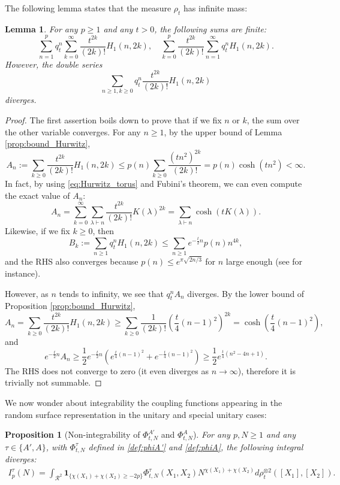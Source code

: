 \documentclass[11pt,a4paper,reqno]{article}
\newtheorem{lemma}[theorem]{Lemma}
\newtheorem{proposition}[theorem]{Proposition}
\theoremstyle{definition}
\theoremstyle{remark}
\begin{document}
The following lemma states that the measure $\rho_t$ has infinite mass:


\begin{lemma}\label{lem:infinite_mass}
For any $p\geq 1$ and any $t>0$, the following sums are finite:
\[
\sum_{n=1}^p q_t^n\sum_{k=0}^\infty \frac{t^{2k}}{(2k)!}H_1(n,2k),\quad \sum_{k=0}^p \frac{t^{2k}}{(2k)!} \sum_{n=1}^\infty q_t^nH_1(n,2k).
\]
However, the double series
\[
\sum_{n\geq 1,k\geq 0}q_t^n\frac{t^{2k}}{(2k)!}H_1(n,2k)
\]
diverges.
\end{lemma}



\begin{proof}
The first assertion boils down to prove that if we fix $n$ or $k$, the sum over the other variable converges. For any $n\geq 1$, by the upper bound of Lemma \ref{prop:bound_Hurwitz},
\[
A_n:=\sum_{k\geq 0}\frac{t^{2k}}{(2k)!}H_1(n,2k)\leq p(n)\sum_{k\geq 0}\frac{(tn^2)^{2k}}{(2k)!}=p(n)\cosh(tn^2)<\infty.
\]
In fact, by using \eqref{eq:Hurwitz_torus} and Fubini's theorem, we can even compute the exact value of $A_n$:
\[
A_n=\sum_{k=0}^\infty\sum_{\lambda\vdash n}\frac{t^{2k}}{(2k)!}K(\lambda)^{2k}=\sum_{\lambda\vdash n}\cosh(tK(\lambda)).
\]
Likewise, if we fix $k\geq 0$, then
\[
B_k:=\sum_{n\geq 1}q_t^nH_1(n,2k)\leq \sum_{n\geq 1}e^{-\frac{t}{2}n}p(n)n^{4k},
\]
and the RHS also converges because $p(n)\leq e^{\pi\sqrt{2n/3}}$ for $n$ large enough (see \cite{Apo} for instance).

However, as $n$ tends to infinity, we see that $q_t^nA_n$ diverges. By the lower bound of Proposition \ref{prop:bound_Hurwitz},
\[
A_n = \sum_{k\geq 0}\frac{t^{2k}}{(2k)!}H_1(n,2k)\geq \sum_{k\geq 0}\frac{1}{(2k)!}\left(\frac{t}{4}\left(n-1\right)^2\right)^{2k}=\cosh\left(\frac{t}{4}(n-1)^2\right),
\]
and
\[
e^{-\frac{t}{2}n}A_n \geq \frac12 e^{-\frac{t}{2}n}\left(e^{\frac{t}{4}(n-1)^2}+e^{-\frac{t}{4}(n-1)^2}\right)\geq \frac12 e^{\frac{t}{4}(n^2-4n+1)}.
\]
The RHS does not converge to zero (it even diverges as $n\to\infty$), therefore it is trivially not summable.
\end{proof}

We now wonder about integrability the coupling functions appearing in the random surface representation in the unitary and special unitary cases:

\begin{proposition}[Non-integrability of $\Phi_{t,N}^{A'}$ and $\Phi_{t,N}^A$]\label{prop:non_integrability_PhiA}
For any $p,N\geq 1$ and any $\tau\in\{A',A\}$, with $\Phi_{t,N}^{\tau}$ defined in \eqref{def:phiA'}  and \eqref{def:phiA}, the following integral diverges:
\begin{align*}
I_p^\tau(N)=\int_{\mathcal{R}^2}\mathbf{1}_{\{\chi(X_1)+\chi(X_2)\geq -2p\}} \Phi_{t,N}^{\tau}(X_1,X_2)N^{\chi(X_1)+\chi(X_2)}d\rho_t^{\otimes 2}([X_1],[X_2]).
\end{align*}
\end{proposition}
\end{document}
